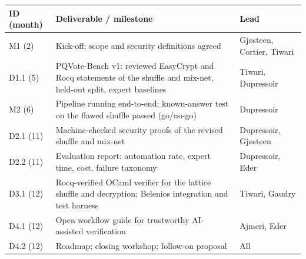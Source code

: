 \documentclass[11pt]{article}
\begin{document}
\vspace{4pt}
\begin{tabular}{@{}p{1.6cm}p{11.0cm}p{3.4cm}@{}}
\toprule
\textbf{ID (month)} & \textbf{Deliverable / milestone} & \textbf{Lead}\\
\midrule
M1 (2) & Kick-off; scope and security definitions agreed & Gj{\o}steen, Cortier, Tiwari\\
D1.1 (5) & PQVote-Bench v1: reviewed EasyCrypt and Rocq statements of the shuffle and mix-net, held-out split, expert baselines & Tiwari, Dupressoir\\
M2 (6) & Pipeline running end-to-end; known-answer test on the flawed shuffle passed (go/no-go) & Dupressoir\\
D2.1 (11) & Machine-checked security proofs of the revised shuffle and mix-net & Dupressoir, Gj{\o}steen\\
D2.2 (11) & Evaluation report: automation rate, expert time, cost, failure taxonomy & Dupressoir, Eder\\
D3.1 (12) & Rocq-verified OCaml verifier for the lattice shuffle and decryption; Belenios integration and test harness & Tiwari, Gaudry\\
D4.1 (12) & Open workflow guide for trustworthy AI-assisted verification & Ajmeri, Eder\\
D4.2 (12) & Roadmap; closing workshop; follow-on proposal & All\\
\bottomrule
\end{tabular}
\end{document}
